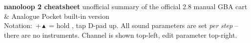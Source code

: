 \documentclass[11pt,a4paper,landscape]{article}
\newcommand{\U}{\ensuremath{\blacktriangle}}
\newcommand{\btn}[1]{{\setlength{\fboxsep}{1.1pt}%
  \fbox{\sffamily\bfseries\fontsize{8.5}{9.5}\selectfont #1}}}
\newcommand{\plus}{\,{+}\,}
\begin{document}
\begin{tcbposter}[
  poster = {columns=12, rows=7, rowspacing=1.6mm, colspacing=2.4mm,
            width=\textwidth, height=\textheight},
  boxes  = {nlbox},
]
  {{\bfseries\fontsize{35}{40}\selectfont nanoloop 2 \textperiodcentered{} cheatsheet}\hfill
   {\footnotesize unofficial summary of the official 2.8 manual \textperiodcentered{}
    GBA cart \& Analogue Pocket built-in version}\\[2pt]
   Notation: \btn{B}\plus\U\ = hold \btn{B}, tap D-pad up.
    All sound parameters are set \emph{per step} -- there are no instruments.
    Channel is shown top-left, edit parameter top-right.}


\end{tcbposter}
\end{document}

